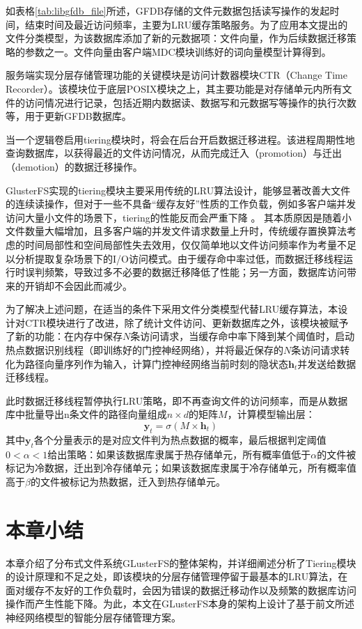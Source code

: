 如表格\ref{tab:libgfdb_file}所述，GFDB存储的文件元数据包括读写操作的发起时间，结束时间及最近访问频率，主要为LRU缓存策略服务。为了应用本文提出的文件分类模型，为该数据库添加了新的元数据项：文件向量，作为后续数据迁移策略的参数之一。文件向量由客户端MDC模块训练好的词向量模型计算得到。

服务端实现分层存储管理功能的关键模块是访问计数器模块CTR（Change Time Recorder）。该模块位于底层POSIX模块之上，其主要功能是对存储单元内所有文件的访问情况进行记录，包括近期内数据读、数据写和元数据写等操作的执行次数等，用于更新GFDB数据库。

当一个逻辑卷启用tiering模块时，将会在后台开启数据迁移进程。该进程周期性地查询数据库，以获得最近的文件访问情况，从而完成迁入（promotion）与迁出（demotion）的数据迁移操作。


GlusterFS实现的tiering模块主要采用传统的LRU算法设计，能够显著改善大文件的连续读操作，但对于一些不具备“缓存友好”性质的工作负载，例如多客户端并发访问大量小文件的场景下，tiering的性能反而会严重下降
\cite{Red_Hat_Gluster_storage_on_supermicro_storage_servers_powered_by_Intel_Xeon_processors}。
其本质原因是随着小文件数量大幅增加，且多客户端的并发文件请求数量上升时，传统缓存置换算法考虑的时间局部性和空间局部性失去效用，仅仅简单地以文件访问频率作为考量不足以分析提取复杂场景下的I/O访问模式。由于缓存命中率过低，而数据迁移线程运行时误判频繁，导致过多不必要的数据迁移降低了性能；另一方面，数据库访问带来的开销却不会因此而减少。

为了解决上述问题，在适当的条件下采用文件分类模型代替LRU缓存算法，本设计对CTR模块进行了改进，除了统计文件访问、更新数据库之外，该模块被赋予了新的功能：在内存中保存$N$条访问请求，当缓存命中率下降到某个阈值时，启动热点数据识别线程（即训练好的门控神经网络），并将最近保存的$N$条访问请求转化为路径向量序列作为输入，计算门控神经网络当前时刻的隐状态$\mathbf{h}_t$并发送给数据迁移线程。

此时数据迁移线程暂停执行LRU策略，即不再查询文件的访问频率，而是从数据库中批量导出n条文件的路径向量组成$n\times d$的矩阵$M$，计算模型输出层：
\begin{equation}
    \mathbf{y}_t = \sigma(M \times \mathbf{h}_t)
\end{equation}
其中$\mathbf{y}_t$各个分量表示的是对应文件判为热点数据的概率，最后根据判定阈值$0<\alpha<1$给出策略：如果该数据库隶属于热存储单元，所有概率值低于$\alpha$的文件被标记为冷数据，迁出到冷存储单元；如果该数据库隶属于冷存储单元，所有概率值高于$\beta$的文件被标记为热数据，迁入到热存储单元。









\section{本章小结}
本章介绍了分布式文件系统GLusterFS的整体架构，并详细阐述分析了Tiering模块的设计原理和不足之处，即该模块的分层存储管理停留于最基本的LRU算法，在面对缓存不友好的工作负载时，会因为错误的数据迁移动作以及频繁的数据库访问操作而产生性能下降。为此，本文在GLusterFS本身的架构上设计了基于前文所述神经网络模型的智能分层存储管理方案。
